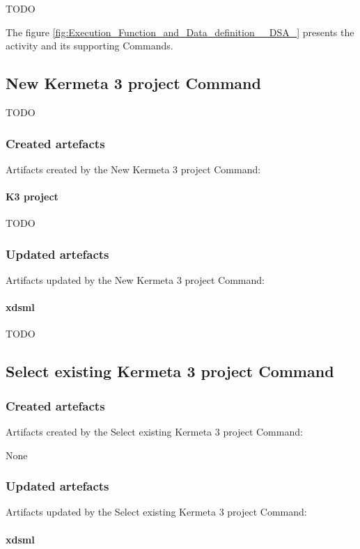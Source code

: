 \documentclass{gemoc} %
\begin{document}
TODO

The figure \ref{fig:Execution_Function_and_Data_definition__DSA_} presents the activity and its supporting Commands.

\subsection{New Kermeta 3 project Command}
TODO
\subsubsection{Created artefacts}
Artifacts created by the New Kermeta 3 project Command:
\paragraph{K3 project} 
TODO
\subsubsection{Updated artefacts}
Artifacts updated by the New Kermeta 3 project Command:
\paragraph{xdsml} 
TODO

\subsection{Select existing Kermeta 3 project Command}

\subsubsection{Created artefacts}
Artifacts created by the Select existing Kermeta 3 project Command:

	None
\subsubsection{Updated artefacts}
Artifacts updated by the Select existing Kermeta 3 project Command:
\paragraph{xdsml} 
\end{document}
